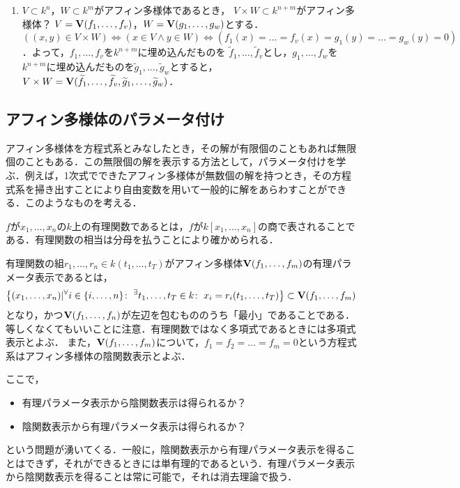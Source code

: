 \documentclass[9pt]{ltjsarticle}
\theoremstyle{break}
\theoremstyle{break}
\theoremstyle{break}
\theoremstyle{break}
\theoremstyle{break}
\theoremstyle{break}
\theoremstyle{break}
\theoremstyle{break}
\theoremstyle{break}
\theoremstyle{break}
\theoremstyle{break}
\theoremstyle{break}
\theoremstyle{break}
\theoremstyle{break}
\theoremstyle{break}
\theoremstyle{nonumberbreak}
\theoremstyle{nonumberbreak}
\begin{document}
\begin{enumerate}[label=(問題\arabic*)]
\begin{enumerate}[label=(\alph*)]
 \item $V\subset k^n$，$W\subset k^m$がアフィン多様体であるとき，
$V\times W \subset k^{n+m}$がアフィン多様体？
$V=\textbf V(f_1,\dots,f_v)$，$W=\textbf V(g_1,\dots,g_w)$とする．
$((x,y)\in V\times W) \iff (x\in V \land y\in W) \iff (f_1(x)=\dots = f_v(x) = g_1(y)=\dots = g_w(y)=0)$．よって，$f_1,\dots,f_v$を$k^{n+m}$に埋め込んだものを
$\tilde f_1,\dots, \tilde f_v$とし，$g_1,\dots, f_w$を$k^{n+m}$に埋め込んだものを$\tilde g_1,\dots, \tilde g_w$とすると，$V\times W = \textbf V(\widetilde f_1,\dots,\widetilde f_v,\widetilde g_1,\dots, \widetilde g_w)$．
\end{enumerate}
\end{enumerate}

\subsection{アフィン多様体のパラメータ付け}
アフィン多様体を方程式系とみなしたとき，その解が有限個のこともあれば無限個のこともある．この無限個の解を表示する方法として，パラメータ付けを学ぶ．例えば，1次式でできたアフィン多様体が無数個の解を持つとき，その方程式系を掃き出すことにより自由変数を用いて一般的に解をあらわすことができる．このようなものを考える．

$f$が$x_1,\dots,x_n$の$k$上の有理関数であるとは，$f$が$k[x_1,\dots,x_n]$の商で表されることである．有理関数の相当は分母を払うことにより確かめられる．

有理関数の組$r_1,\dots,r_n \in k(t_1,\dots,t_T)$がアフィン多様体$\textbf V(f_1,\dots,f_m)$の有理パラメータ表示であるとは，
\begin{align}
\left\{(x_1,\dots,x_n) | {}^{\forall}{i\in \left\{i,\dots,n\right\}}\mathrm{\colon\;} {}^{\exists}{t_1,\dots,t_T \in k}\mathrm{\colon\;} x_i = r_i(t_1,\dots,t_T)\right\} \subset \textbf V(f_1,\dots,f_m)
\end{align}
となり，かつ$\textbf V(f_1,\dots,f_n)$が左辺を包むもののうち「最小」であることである．等しくなくてもいいことに注意．有理関数ではなく多項式であるときには多項式表示とよぶ．
また，$\textbf V(f_1,\dots,f_m)$について，$f_1=f_2=\dots=f_m=0$という方程式系はアフィン多様体の陰関数表示とよぶ．

ここで，
\begin{itemize}
 \item 有理パラメータ表示から陰関数表示は得られるか？
 \item 陰関数表示から有理パラメータ表示は得られるか？
\end{itemize}
という問題が湧いてくる．一般に，陰関数表示から有理パラメータ表示を得ることはできず，それができるときには単有理的であるという．有理パラメータ表示から陰関数表示を得ることは常に可能で，それは消去理論で扱う．
\end{document}
